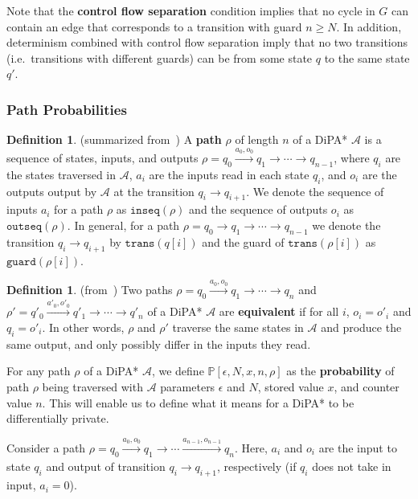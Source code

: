 \documentclass[12pt]{article}
\newcommand{\PP}{\mathbb{P}}
\theoremstyle{definition}
\newtheorem{defn}[thm]{Definition}
\begin{document}
Note that the \textbf{control flow separation} condition implies that no cycle in $G$ can contain an edge that corresponds to a transition with guard $n\geq N$. In addition, determinism combined with control flow separation imply that no two transitions (i.e.\ transitions with different guards) can be from some state $q$ to the same state $q'$. 

\subsubsection{Path Probabilities}


\begin{defn} (summarized from~\cite{chadhaLinearTimeDecidability2021})
	A \textbf{path} $\rho$ of length $n$ of a DiPA* $\mathcal{A}$ is a sequence of states, inputs, and outputs $\rho = q_0\xrightarrow{a_0, o_0} q_1\to\cdots \to q_{n-1}$, where $q_i$ are the states traversed in $\mathcal{A}$, $a_i$ are the inputs read in each state $q_i$, and $o_i$ are the outputs output by $\mathcal{A}$ at the transition $q_i\to q_{i+1}$. 
	We denote the sequence of inputs $a_i$ for a path $\rho$ as $\texttt{inseq}(\rho)$ and the sequence of outputs $o_i$ as $\texttt{outseq}(\rho)$. In general, for a path $\rho = q_0\to q_1\to \cdots \to q_{n-1}$ we denote the transition $q_i\to q_{i+1}$ by $\texttt{trans}(q[i])$ and the guard of $\texttt{trans}(\rho[i])$ as $\texttt{guard}(\rho[i])$.
\end{defn}

\begin{defn} (from~\cite{chadhaLinearTimeDecidability2021})
	Two paths $\rho = q_0\xrightarrow{a_0, o_0} q_1\to\cdots \to q_n$ and $\rho' = q'_0 \xrightarrow{a'_0, o'_0} q'_1 \to \cdots \to q'_n$ of a DiPA* $\mathcal{A}$ are \textbf{equivalent} if for all $i$, $o_i = o'_i$ and $q_i = o'_i$. In other words, $\rho$ and $\rho'$ traverse the same states in $\mathcal{A}$ and produce the same output, and only possibly differ in the inputs they read. 
\end{defn}



For any path $\rho$ of a DiPA* $\mathcal{A}$, we define $\PP[\epsilon, N, x, n, \rho]$ as the \textbf{probability} of path $\rho$ being traversed with $\mathcal{A}$ parameters $\epsilon$ and $N$, stored value $x$, and counter value $n$. This will enable us to define what it means for a DiPA* to be differentially private.

Consider a path $\rho = q_0\xrightarrow[]{a_0, o_0}q_1\rightarrow\cdots\xrightarrow[]{a_{n-1}, o_{n-1}} q_n$. Here, $a_i$ and $o_i$ are the input to state $q_i$ and output of transition $q_i\to q_{i+1}$, respectively (if $q_i$ does not take in input, $a_i = 0$).
\end{document}
